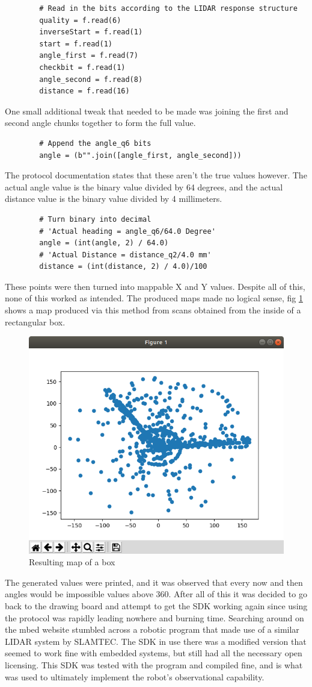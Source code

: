 		\begin{lstlisting}
		# Read in the bits according to the LIDAR response structure
		quality = f.read(6)
		inverseStart = f.read(1)
		start = f.read(1)
		angle_first = f.read(7)
		checkbit = f.read(1)
		angle_second = f.read(8)
		distance = f.read(16)
		\end{lstlisting}
		One small additional tweak that needed to be made was joining the first and second angle chunks together to form the full value.
		
		\begin{lstlisting}
		# Append the angle_q6 bits
		angle = (b"".join([angle_first, angle_second]))
		\end{lstlisting}
		
		The protocol documentation states that these aren't the true values however. The actual angle value is the binary value divided by 64 degrees, and the actual distance value is the binary value divided by 4 millimeters.
		
		\begin{lstlisting}
		# Turn binary into decimal
		# 'Actual heading = angle_q6/64.0 Degree'
		angle = (int(angle, 2) / 64.0)
		# 'Actual Distance = distance_q2/4.0 mm'
		distance = (int(distance, 2) / 4.0)/100
		\end{lstlisting}
		These points were then turned into mappable X and Y values. Despite all of this, none of this worked as intended. The produced maps made no logical sense, fig \ref{fig:failedmap} shows a map produced via this method from scans obtained from the inside of a rectangular box.
		\begin{figure}[ht]
			\centering
			\includegraphics[width=.6\linewidth]{SYNTHESIS/failedmap.png}
			\caption{Resulting map of a box}
			\label{fig:failedmap}
		\end{figure}
	
		The generated values were printed, and it was observed that every now and then angles would be impossible values above 360. After all of this it was decided to go back to the drawing board and attempt to get the SDK working again since using the protocol was rapidly leading nowhere and burning time. Searching around on the mbed website stumbled across a robotic program that made use of a similar LIDAR system by SLAMTEC. The SDK in use there was a modified version that seemed to work fine with embedded systems, but still had all the necessary open licensing. This SDK was tested with the program and compiled fine, and is what was used to ultimately implement the robot's observational capability.
		
